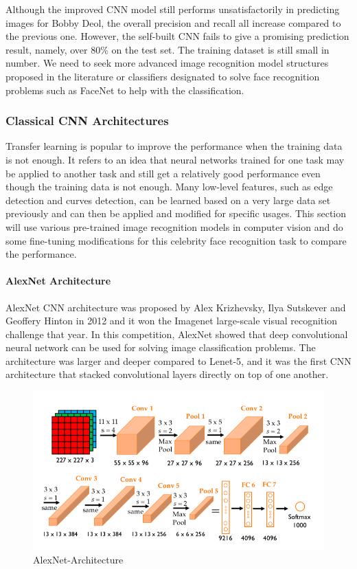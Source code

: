 Although the improved CNN model still performs unsatisfactorily in predicting images for Bobby Deol, the overall precision and recall all increase compared to the previous one. However, the self-built CNN fails to give a promising prediction result, namely, over 80\% on the test set. The training dataset is still small in number. We need to seek more advanced image recognition model structures proposed in the literature or classifiers designated to solve face recognition problems such as FaceNet to help with the classification.


\subsubsection{Classical CNN Architectures}

Transfer learning is popular to improve the performance when the training data is not enough. It refers to an idea that neural networks trained for one task may be applied to another task and still get a relatively good performance even though the training data is not enough. Many low-level features, such as edge detection and curves detection, can be learned based on a very large data set previously and can then be applied and modified for specific usages. This section will use various pre-trained image recognition models in computer vision and do some fine-tuning modifications for this celebrity face recognition task to compare the performance.

\paragraph{AlexNet Architecture}

 AlexNet CNN architecture\cite{krizhevsky2012imagenet} was proposed by Alex Krizhevsky, Ilya Sutskever and Geoffery Hinton in 2012 and it won the Imagenet large-scale visual recognition challenge that year. In this competition, AlexNet showed that deep convolutional neural network can be used for solving image classification problems. The architecture was larger and deeper compared to Lenet-5, and it was the first CNN architecture that stacked convolutional layers directly on top of one another. 

\begin{figure}[H]
    \centering\includegraphics[width=12cm]{./figures/alexnet1.png}
    \caption{AlexNet-Architecture}
    \label{pic:alexnet}
\end{figure}

